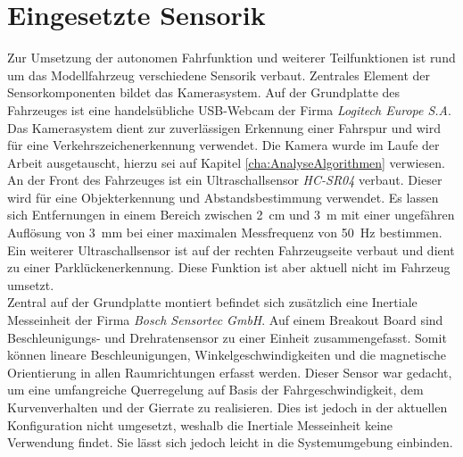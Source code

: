 \section{Eingesetzte Sensorik}				\label{sec:EVObotSensorik}
Zur Umsetzung der autonomen Fahrfunktion und weiterer Teilfunktionen ist rund um das Modellfahrzeug verschiedene Sensorik verbaut. Zentrales Element der Sensorkomponenten bildet das Kamerasystem. Auf der Grundplatte des Fahrzeuges ist eine handelsübliche USB-Webcam der Firma \emph{Logitech Europe S.A}. Das Kamerasystem dient zur zuverlässigen Erkennung einer Fahrspur und wird für eine Verkehrszeichenerkennung verwendet. Die Kamera wurde im Laufe der Arbeit ausgetauscht, hierzu sei auf Kapitel \ref{cha:AnalyseAlgorithmen} verwiesen.\\
An der Front des Fahrzeuges ist ein Ultraschallsensor \emph{HC-SR04} verbaut. Dieser wird für eine Objekterkennung und Abstandsbestimmung verwendet. Es lassen sich Entfernungen in einem Bereich zwischen \SI{2}{\centi\meter} und \SI{3}{\meter} mit einer ungefähren Auflösung von \SI{3}{\milli\meter} bei einer maximalen Messfrequenz von \SI{50}{\hertz} bestimmen. Ein weiterer Ultraschallsensor ist auf der rechten Fahrzeugseite verbaut und dient zu einer Parklückenerkennung. Diese Funktion ist aber aktuell nicht im Fahrzeug umsetzt.\\
Zentral auf der Grundplatte montiert befindet sich zusätzlich eine Inertiale
Messeinheit der Firma \emph{Bosch Sensortec GmbH}. Auf einem Breakout Board sind Beschleunigungs- und Drehratensensor zu einer Einheit zusammengefasst. Somit können lineare Beschleunigungen, Winkelgeschwindigkeiten und die magnetische Orientierung in allen Raumrichtungen erfasst werden. Dieser Sensor war gedacht, um eine umfangreiche Querregelung auf Basis der Fahrgeschwindigkeit, dem Kurvenverhalten und der Gierrate zu realisieren. Dies ist jedoch in der aktuellen Konfiguration nicht umgesetzt, weshalb die Inertiale Messeinheit keine Verwendung findet. Sie lässt sich jedoch leicht in die Systemumgebung einbinden. 
  

